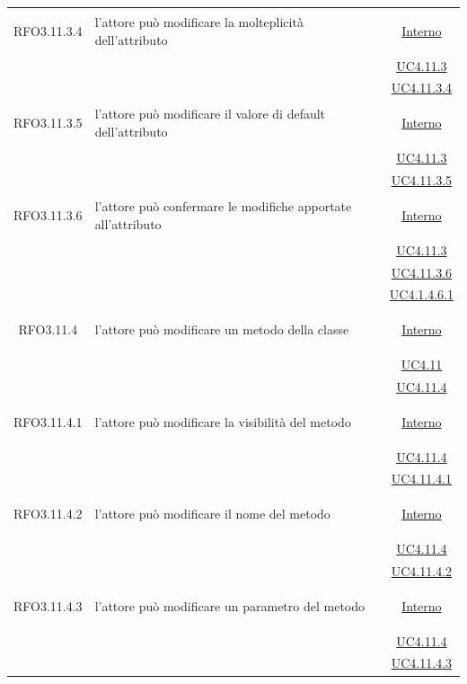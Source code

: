 \begin{longtable}{|c|>{\centering}m{7cm}|c|}
\hypertarget{RFO3.11.3.4}{RFO3.11.3.4} & l'attore può modificare la molteplicità dell'attributo &  \hyperlink{Interno}{Interno}\\
& &\hyperref[UC4.11.3]{UC4.11.3}\\
& &\hyperref[UC4.11.3.4]{UC4.11.3.4}\\ \hline

\hypertarget{RFO3.11.3.5}{RFO3.11.3.5} & l'attore può modificare il valore di default dell'attributo &  \hyperlink{Interno}{Interno}\\
& &\hyperref[UC4.11.3]{UC4.11.3}\\
& &\hyperref[UC4.11.3.5]{UC4.11.3.5}\\ \hline

\hypertarget{RFO3.11.3.6}{RFO3.11.3.6} & l'attore può confermare le modifiche apportate all'attributo &  \hyperlink{Interno}{Interno}\\
& &\hyperref[UC4.11.3]{UC4.11.3}\\
& &\hyperref[UC4.11.3.6]{UC4.11.3.6}\\
& &\hyperref[UC4.1.4.6.1]{UC4.1.4.6.1}\\ \hline

\hypertarget{RFO3.11.4}{RFO3.11.4} & l'attore può modificare un metodo della classe &  \hyperlink{Interno}{Interno}\\
& &\hyperref[UC4.11]{UC4.11}\\
& &\hyperref[UC4.11.4]{UC4.11.4}\\ \hline

\hypertarget{RFO3.11.4.1}{RFO3.11.4.1} & l'attore può modificare la visibilità del metodo &  \hyperlink{Interno}{Interno}\\
& &\hyperref[UC4.11.4]{UC4.11.4}\\
& &\hyperref[UC4.11.4.1]{UC4.11.4.1}\\ \hline

\hypertarget{RFO3.11.4.2}{RFO3.11.4.2} & l'attore può modificare il nome del metodo &  \hyperlink{Interno}{Interno}\\
& &\hyperref[UC4.11.4]{UC4.11.4}\\
& &\hyperref[UC4.11.4.2]{UC4.11.4.2}\\ \hline

\hypertarget{RFO3.11.4.3}{RFO3.11.4.3} & l'attore può modificare un parametro del metodo &  \hyperlink{Interno}{Interno}\\
& &\hyperref[UC4.11.4]{UC4.11.4}\\
& &\hyperref[UC4.11.4.3]{UC4.11.4.3}\\ \hline


\end{longtable}
